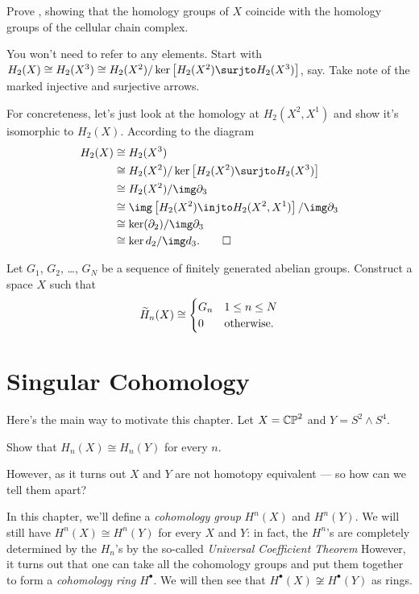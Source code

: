 \documentclass[11pt]{scrreprt}
\begin{document}
\begin{problem}
	\label{prob:diagram_chase}
	Prove ,
	showing that the homology groups of $X$
	coincide with the homology groups of the cellular chain complex.
	\begin{hint}
		You won't need to refer to any elements.
		Start with $H_2(X) \cong H_2(X^3) \cong
			H_2(X^2) / \ker \left[ H_2(X^2) \surjto H_2(X^3) \right]$, say.
		Take note of the marked injective and surjective arrows.
	\end{hint}
	\begin{sol}
		For concreteness, let's just look at the homology at $H_2(X^2, X^1)$
		and show it's isomorphic to $H_2(X)$.
		According to the diagram
		\begin{align*}
			H_2(X) &\cong H_2(X^3) \\
			&\cong H_2(X^2) / \ker \left[ H_2(X^2) \surjto H_2(X^3) \right] \\
			&\cong H_2(X^2) / \img \partial_3 \\
			&\cong \img\left[ H_2(X^2) \injto H_2(X^2, X^1) \right] / \img \partial_3 \\
			&\cong \ker(\partial_2) / \img\partial_3 \\
			&\cong \ker d_2 / \img d_3. \qedhere
		\end{align*}
	\end{sol}
\end{problem}

\begin{problem}
	Let $G_1$, $G_2$, \dots, $G_N$ be a sequence of finitely generated abelian groups.
	Construct a space $X$ such that
	\[
		\widetilde H_n(X)
		\cong
		\begin{cases}
			G_n & 1 \le n \le N \\
			0 & \text{otherwise}.
		\end{cases}
	\]
\end{problem}

\chapter{Singular Cohomology}
Here's the main way to motivate this chapter.
Let $X = \mathbb{CP}^2$ and $Y = S^2 \wedge S^4$.
\begin{exercise}
	Show that $H_n(X) \cong H_n(Y)$ for every $n$.
\end{exercise}
However, as it turns out $X$ and $Y$ are not homotopy equivalent --- so how can we tell them apart?

In this chapter, we'll define a \emph{cohomology group} $H^n(X)$ and $H^n(Y)$.
We will still have $H^n(X) \cong H^n(Y)$ for every $X$ and $Y$:
in fact, the $H^n$'s are completely determined by the $H_n$'s
by the so-called \emph{Universal Coefficient Theorem}
However, it turns out that one can take all the cohomology groups and put
them together to form a \emph{cohomology ring} $H^\bullet$.
We will then see that $H^\bullet(X) \not\cong H^\bullet(Y)$ as rings.
\end{document}
